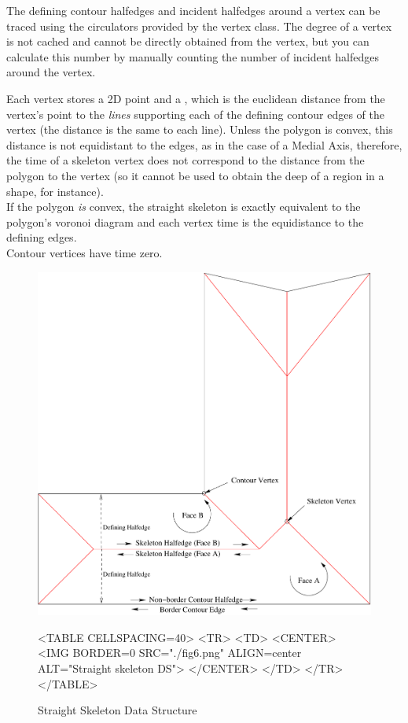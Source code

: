The defining contour halfedges and incident halfedges around a vertex can be traced using the circulators provided by the vertex class. The degree of a vertex is not cached and cannot be directly obtained from the vertex, but you can calculate this number by manually counting the number of incident halfedges around the vertex.

Each vertex stores a 2D point and a , which is the euclidean distance from the vertex's point to the \textit{lines} supporting each of the defining contour edges of the vertex (the distance is the same to each line). Unless the polygon is convex, this distance is not equidistant to the edges, as in the case of a Medial Axis, therefore, the time of a skeleton vertex does not correspond to the distance from the polygon to the vertex (so it cannot be used to obtain the deep of a region in a shape, for instance).\\
If the polygon \textit{is} convex, the straight skeleton is exactly equivalent to the polygon's voronoi diagram and each vertex time is the equidistance to the defining edges.\\
Contour vertices have time zero.

\begin{figure}[htbp]
\begin{ccTexOnly}
\begin{center}
\includegraphics{Straight_skeleton_2/fig6} %
\end{center}
\end{ccTexOnly}

\begin{ccHtmlOnly}
<TABLE CELLSPACING=40>
<TR>
<TD>
<CENTER>
<IMG BORDER=0 SRC="./fig6.png" ALIGN=center ALT="Straight skeleton DS">
</CENTER>
</TD>
</TR>
</TABLE>
\end{ccHtmlOnly}

\caption{Straight Skeleton Data Structure
\label{Simplepoly-offsets}}
\end{figure}

